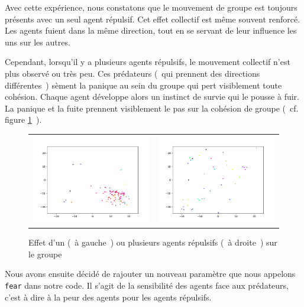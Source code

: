 \documentclass[french, a4paper, 12pt, openany]{report}
\begin{document}
       Avec cette expérience, nous constatons que le mouvement de groupe est toujours présents avec un seul agent répulsif. Cet effet collectif est même souvent renforcé. Les agents fuient dans la même direction, tout en se servant de leur influence les uns sur les autres.
       
        Cependant, lorsqu'il y a plusieurs agents répulsifs, le mouvement collectif n'est plus observé ou très peu. Ces prédateurs (~qui prennent des directions différentes~)  sèment la panique au sein du groupe qui pert visiblement toute cohésion. Chaque agent développe alors un instinct de survie qui le pousse à fuir. La panique et la fuite prennent visiblement le pas sur la cohésion de groupe (~cf. figure \ref{repulsifs_agents}~).
       
     \begin{figure}[!h]
		\centering
		\begin{tabular}{cc}
			\includegraphics[width=8cm]{images/image_17.png} & \includegraphics[width=8cm]{images/image_16.png} \\
		\end{tabular}
		\caption{Effet d'un (~à gauche~) ou plusieurs agents répulsifs (~à droite~) sur le groupe}
		\label{repulsifs_agents}
	\end{figure}
       
   Nous avons ensuite décidé de rajouter un nouveau paramètre que nous appelons \verb|fear| dans notre code. Il s'agit de la sensibilité des agents face aux prédateurs, c'est à dire à la peur des agents pour les agents répulsifs. 
   
\end{document}
